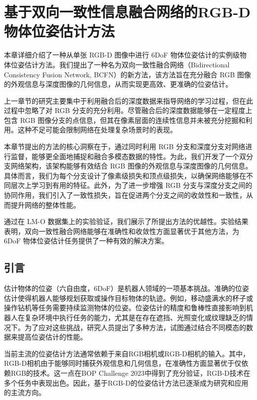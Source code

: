 \chapter{基于双向一致性信息融合网络的RGB-D物体位姿估计方法}

本章详细介绍了一种从单张 RGB-D 图像中进行 6DoF 物体位姿估计的实例级物体位姿估计方法。我们提出了一种名为双向一致性融合网络（Bidirectional Consistency Fusion Network, BCFN）的新方法，该方法旨在充分融合 RGB 图像的外观信息与深度图像的几何信息，从而实现更高效、更准确的位姿估计。

上一章节的研究主要集中于利用融合后的深度数据来指导网络的学习过程，但在此过程中忽略了对 RGB 分支的充分利用。尽管融合后的深度数据能够在一定程度上包含 RGB 图像分支的点信息，但其在像素层面的连续性信息并未被充分挖掘和利用。这种不足可能会限制网络在处理复杂场景时的表现。

本章节提出的方法的核心洞察在于，通过同时利用 RGB 分支和深度分支对网络进行监督，能够更全面地捕捉和融合多模态数据的特性。为此，我们开发了一个双分支网络架构，该架构能够有效结合 RGB 图像的外观信息与深度图像的几何信息。具体而言，我们为每个分支设计了像素级损失和顶点级损失，以确保网络能够在不同层次上学习到有用的特征。此外，为了进一步增强 RGB 分支与深度分支之间的协同作用，我们引入了一致性损失，旨在促进两个分支之间的收敛性和一致性，从而提升网络的整体性能。

通过在 LM-O 数据集上的实验验证，我们展示了所提出方法的优越性。实验结果表明，双向一致性融合网络能够在准确性和收敛性方面显著优于其他方法，为 6DoF 物体位姿估计任务提供了一种有效的解决方案。

\section{引言}

估计物体的位姿（六自由度，6DoF）是机器人领域的一项基本挑战。准确的位姿估计使得机器人能够规划获取或操作目标物体的轨迹。例如，移动盛满水的杯子或操作钻机等任务需要持续监测物体的位姿。位姿估计的精度和鲁棒性直接影响到机器人在复杂环境中执行任务的能力，尤其是在存在遮挡、光照变化或纹理缺乏的情况下。为了应对这些挑战，研究人员提出了多种方法，试图通过结合不同模态的数据来提高位姿估计的性能。

当前主流的位姿估计方法通常依赖于来自RGB相机\cite{su2022zebrapose}或RGB-D相机\cite{2024hipose}的输入。其中，RGB-D相机由于能够同时捕获外观信息和几何信息，在准确性方面显著优于仅依赖RGB的技术。这一点在BOP Challenge 2023\cite{hodan2024bop}中得到了充分验证，RGB-D技术在多个任务中表现出色。因此，基于RGB-D的位姿估计方法已逐渐成为研究和应用的主流方向。

